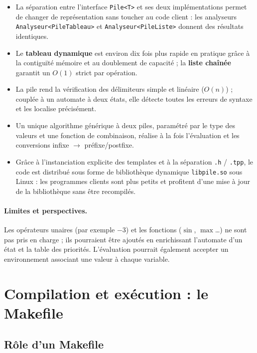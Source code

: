 \documentclass[11pt,a4paper]{article}
\newcommand{\code}[1]{\texttt{#1}}
\begin{document}
\begin{itemize}
  \item La séparation entre l'interface \code{Pile<T>} et ses deux
        implémentations permet de changer de représentation sans toucher au
        code client : les analyseurs \code{Analyseur<PileTableau>} et
        \code{Analyseur<PileListe>} donnent des résultats identiques.
  \item Le \textbf{tableau dynamique} est environ dix fois plus rapide en
        pratique grâce à la contiguïté mémoire et au doublement de capacité ;
        la \textbf{liste chaînée} garantit un $O(1)$ strict par opération.
  \item La pile rend la vérification des délimiteurs simple et linéaire
        ($O(n)$) ; couplée à un automate à deux états, elle détecte toutes
        les erreurs de syntaxe et les localise précisément.
  \item Un unique algorithme générique à deux piles, paramétré par le type
        des valeurs et une fonction de combinaison, réalise à la fois
        l'évaluation et les conversions infixe $\to$ préfixe/postfixe.
  \item Grâce à l'instanciation explicite des templates et à la séparation
        \code{.h} / \code{.tpp}, le code est distribué sous forme de
        bibliothèque dynamique \code{libpile.so} sous Linux : les programmes
        clients sont plus petits et profitent d'une mise à jour de la
        bibliothèque sans être recompilés.
\end{itemize}

\paragraph{Limites et perspectives.} Les opérateurs unaires (par exemple
$-3$) et les fonctions ($\sin$, $\max$\dots) ne sont pas pris en charge ; ils
pourraient être ajoutés en enrichissant l'automate d'un état et la table des
priorités. L'évaluation pourrait également accepter un environnement
associant une valeur à chaque variable.

\appendix
\section{Compilation et exécution : le Makefile}

\subsection{Rôle d'un Makefile}
\end{document}
